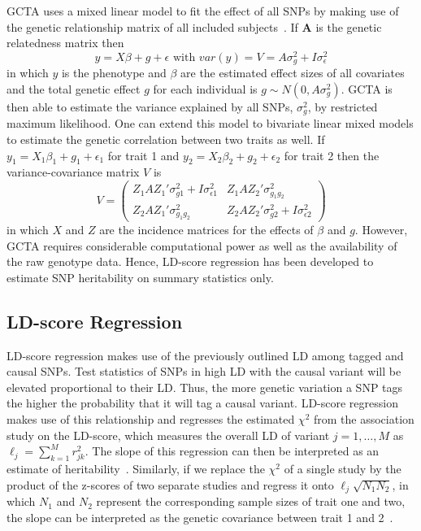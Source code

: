 GCTA uses a mixed linear model to  fit the effect of all SNPs by making use of the genetic relationship matrix of all included subjects~\cite{Yang2011}.
If $\textbf{A}$ is the genetic relatedness matrix then
\begin{equation}
  y = X\beta + g + \epsilon \text{ with } var(y) = V = A\sigma^2_g + I\sigma^2_\epsilon
\end{equation}
in which $y$ is the phenotype and $\beta$ are the estimated effect sizes of all covariates and the total genetic effect $g$ for each individual is $g \sim N(0, A\sigma^2_g)$.
GCTA is then able to estimate the variance explained by all SNPs, $\sigma^2_g$, by restricted maximum likelihood.
One can extend this model to bivariate linear mixed models to estimate the genetic correlation between two traits as well.
If $y_1 = X_1\beta_1 + g_1 + \epsilon_1$ for trait 1 and $y_2= X_2\beta_2 + g_2 + \epsilon_2$ for trait 2 then the variance-covariance matrix $V$ is
\begin{equation}
  V = 
  \begin{pmatrix}
    Z_1AZ_1'\sigma^2_{g1} + I\sigma^2_{\epsilon 1} & Z_1AZ_2'\sigma^2_{g_1g_2} \\
    Z_2AZ_1'\sigma^2_{g_1g_2} & Z_2AZ_2'\sigma^2_{g2} + I\sigma^2_{\epsilon 2}
  \end{pmatrix}
\end{equation}
in which $X$ and $Z$ are the incidence matrices for the effects of $\beta$ and $g$.
However, GCTA requires considerable computational power as well as the availability of the raw genotype data.
Hence, LD-score regression has been developed to estimate SNP heritability on summary statistics only.

\subsection{LD-score Regression}
\label{sub:ld_score_regression}

LD-score regression makes use of the previously outlined LD among tagged and causal SNPs.
Test statistics of SNPs in high LD with the causal variant will be elevated proportional to their LD\@.
Thus, the more genetic variation a SNP tags the higher the probability that it will tag a causal variant.
LD-score regression makes use of this relationship and regresses the estimated $\chi^2$ from the association study on the LD-score, which measures the overall LD of variant $j = 1, \ldots, M$ as $\ell_j = \sum^M_{k=1} r^2_{jk}$. 
The slope of this regression can then be interpreted as an estimate of heritability~\cite{Bulik-Sullivan2015}.
Similarly, if we replace the $\chi^2$ of a single study by the product of the z-scores of two separate studies and regress it onto $\ell_j \sqrt{N_{1}N_{2}}$, in which $N_1$ and $N_2$ represent the corresponding sample sizes of trait one and two, the slope can be interpreted as the genetic covariance between trait 1 and 2~\cite{Bulik-Sullivan2015a}.

